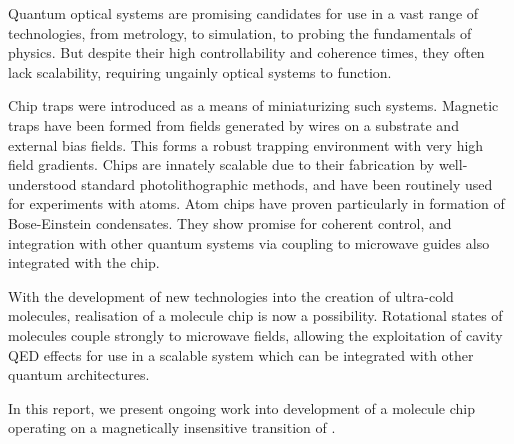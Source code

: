 Quantum optical systems are promising candidates for use in a vast range of
technologies, from metrology, to simulation, to probing the fundamentals of
physics. But despite their high controllability and coherence times, they often
lack scalability, requiring ungainly optical systems to function.

Chip traps were introduced as a means of miniaturizing such systems. Magnetic
traps have been formed from fields generated by wires on a substrate and
external bias fields. This forms a robust trapping environment with very high
field gradients. Chips are innately scalable due to their fabrication by
well-understood standard photolithographic methods, and have been
routinely used for experiments with atoms. Atom chips have proven particularly
in formation of Bose-Einstein condensates. They show promise for coherent
control, and integration with other quantum systems via coupling to microwave
guides also integrated with the chip.

With the development of new technologies into the creation of ultra-cold
molecules, realisation of a molecule chip is now a possibility. Rotational
states of molecules couple strongly to microwave fields, allowing the
exploitation of cavity QED effects for use in a scalable system which can be
integrated with other quantum architectures.

In this report, we present ongoing work into development of a molecule chip
operating on a magnetically insensitive transition of \CaF{}.
